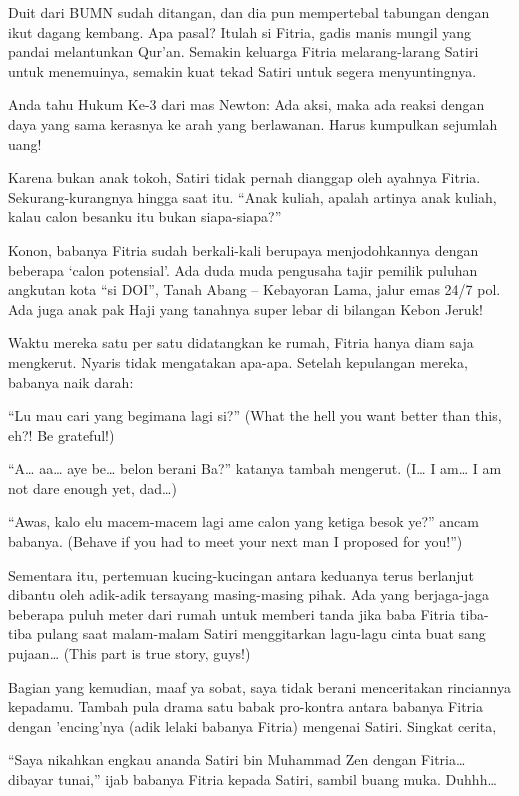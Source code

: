 Duit dari BUMN sudah ditangan, dan dia pun mempertebal tabungan dengan ikut dagang kembang. Apa pasal? Itulah si Fitria, gadis manis mungil yang pandai melantunkan Qur’an. Semakin keluarga Fitria melarang-larang Satiri untuk menemuinya, semakin kuat tekad Satiri untuk segera menyuntingnya.

Anda tahu Hukum Ke-3 dari mas Newton: Ada aksi, maka ada reaksi dengan daya yang sama kerasnya ke arah yang berlawanan. Harus kumpulkan sejumlah uang!

Karena bukan anak tokoh, Satiri tidak pernah dianggap oleh ayahnya Fitria. Sekurang-kurangnya hingga saat itu. “Anak kuliah, apalah artinya anak kuliah, kalau calon besanku itu bukan siapa-siapa?”

Konon, babanya Fitria sudah berkali-kali berupaya menjodohkannya dengan beberapa ‘calon potensial’. Ada duda muda pengusaha tajir pemilik puluhan angkutan kota “si DOI”, Tanah Abang – Kebayoran Lama, jalur emas 24/7 pol. Ada juga anak pak Haji yang tanahnya super lebar di bilangan Kebon Jeruk!

Waktu mereka satu per satu didatangkan ke rumah, Fitria hanya diam saja mengkerut. Nyaris tidak mengatakan apa-apa. Setelah kepulangan mereka, babanya naik darah:

“Lu mau cari yang begimana lagi si?” (What the hell you want better than this, eh?! Be grateful!)

“A… aa… aye be… belon berani Ba?” katanya tambah mengerut. (I… I am… I am not dare enough yet, dad…)

“Awas, kalo elu macem-macem lagi ame calon yang ketiga besok ye?” ancam babanya. (Behave if you had to meet your next man I proposed for you!”)

Sementara itu, pertemuan kucing-kucingan antara keduanya terus berlanjut dibantu oleh adik-adik tersayang masing-masing pihak. Ada yang berjaga-jaga beberapa puluh meter dari rumah untuk memberi tanda jika baba Fitria tiba-tiba pulang saat malam-malam Satiri menggitarkan lagu-lagu cinta buat sang pujaan… (This part is true story, guys!)

Bagian yang kemudian, maaf ya sobat, saya tidak berani menceritakan rinciannya kepadamu. Tambah pula drama satu babak pro-kontra antara babanya Fitria dengan 'encing'nya (adik lelaki babanya Fitria) mengenai Satiri. Singkat cerita,

“Saya nikahkan engkau ananda Satiri bin Muhammad Zen dengan Fitria… dibayar tunai,” ijab babanya Fitria kepada Satiri, sambil buang muka. Duhhh…

